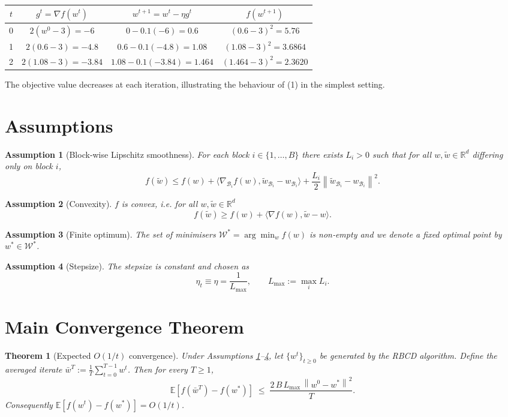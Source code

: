 \documentclass[11pt]{article}
\newtheorem{theorem}{Theorem}
\newtheorem{assumption}{Assumption}
\newcommand{\E}{\mathbb{E}}
\newcommand{\R}{\mathbb{R}}
\newcommand{\norm}[1]{\left\|#1\right\|}
\begin{document}
\begin{tabular}{c|c|c|c}
$t$ & $g^{t}= \nabla f(w^{t})$ & $w^{t+1}=w^{t}-\eta g^{t}$ & $f(w^{t+1})$\\ \hline
0 & $2(w^{0}-3) = -6$ & $0-0.1(-6)=0.6$ & $(0.6-3)^{2}=5.76$\\
1 & $2(0.6-3)=-4.8$ & $0.6-0.1(-4.8)=1.08$ & $(1.08-3)^{2}=3.6864$\\
2 & $2(1.08-3)=-3.84$ & $1.08-0.1(-3.84)=1.464$ & $(1.464-3)^{2}=2.3620$\\
\end{tabular}

The objective value decreases at each iteration, illustrating the
behaviour of (1) in the simplest setting.

\newpage

\section*{Assumptions}
\begin{assumption}[Block‑wise Lipschitz smoothness]\label{ass:smooth}
For each block $i\in\{1,\dots ,B\}$ there exists $L_{i}>0$ such that for all
$w,\tilde w\in\R^{d}$ differing only on block $i$,
\[
f(\tilde w)\le f(w)+\langle \nabla_{\mathcal{B}_{i}} f(w),\tilde w_{\mathcal{B}_{i}}-w_{\mathcal{B}_{i}}\rangle
+\frac{L_{i}}{2}\norm{\tilde w_{\mathcal{B}_{i}}-w_{\mathcal{B}_{i}}}^{2}.
\tag{2}
\]
\end{assumption}
\begin{assumption}[Convexity]\label{ass:convex}
$f$ is convex, i.e. for all $w,\tilde w\in\R^{d}$
\[
f(\tilde w)\ge f(w)+\langle \nabla f(w),\tilde w-w\rangle .
\tag{3}
\]
\end{assumption}
\begin{assumption}[Finite optimum]\label{ass:opt}
The set of minimisers $\mathcal{W}^{*}=\arg\min_{w}f(w)$ is non‑empty and we denote a
fixed optimal point by $w^{*}\in\mathcal{W}^{*}$.
\end{assumption}
\begin{assumption}[Stepsize]\label{ass:steps}
The stepsize is constant and chosen as
\[
\eta_{t}\equiv \eta=\frac{1}{L_{\max}},\qquad 
L_{\max}:=\max_{i}L_{i}.
\tag{4}
\]
\end{assumption}

\section*{Main Convergence Theorem}
\begin{theorem}[Expected $O(1/t)$ convergence]\label{thm:rate}
Under Assumptions \ref{ass:smooth}–\ref{ass:steps},
let $\{w^{t}\}_{t\ge0}$ be generated by the RBCD algorithm.
Define the averaged iterate
$\displaystyle \bar w^{T}:=\frac1T\sum_{t=0}^{T-1}w^{t}$.
Then for every $T\ge1$,
\[
\E\!\left[f(\bar w^{T})-f(w^{*})\right]
\;\le\;
\frac{2\,B\,L_{\max}\, \norm{w^{0}-w^{*}}^{2}}{T}.
\tag{5}
\]
Consequently $\E[f(w^{t})-f(w^{*})]=O(1/t)$.
\end{theorem}
\end{document}

